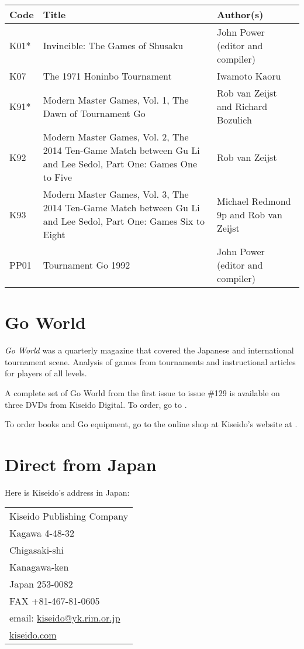 \begin{longtable}{l|p{55mm}|p{55mm}} 
    \hline
    \textbf{Code} & \textbf{Title} & \textbf{Author(s)} \\
    \hline \hline
    K01* & Invincible: The Games of Shusaku & John Power (editor and compiler) \\
    \hline
    K07 & The 1971 Honinbo Tournament & Iwamoto Kaoru \\
    \hline
    K91* & Modern Master Games, Vol. 1, The Dawn of Tournament Go & Rob van Zeijst and Richard Bozulich \\
    \hline
    K92 & Modern Master Games, Vol. 2, The 2014 Ten-Game Match between Gu Li and Lee Sedol, Part One: Games One to Five & Rob van Zeijst \\
    \hline
    K93 & Modern Master Games, Vol. 3, The 2014 Ten-Game Match between Gu Li and Lee Sedol, Part One: Games Six to Eight & Michael Redmond 9p and Rob van Zeijst \\
    \hline
    PP01 & Tournament Go 1992 & John Power (editor and compiler) \\
    \hline
\end{longtable}

\section{Go World}

\emph{Go World} was a quarterly magazine that covered the Japanese and international tournament scene. Analysis of games from tournaments and instructional articles for players of all levels.

A complete set of Go World from the first issue to issue \#129 is available on three DVDs from Kiseido Digital. To order, go to \href{https://www.kiseidodigital.com}{}.

To order books and Go equipment, go to the online shop at Kiseido's website at \href{https://www.kiseido.com}{}.

\section{Direct from Japan}

Here is Kiseido's address in Japan:

\bigskip
\bigskip

\begin{tabular}{l}
    \hline
    Kiseido Publishing Company \\
    Kagawa 4-48-32 \\
    Chigasaki-shi \\
    Kanagawa-ken \\
    Japan 253-0082 \\
    FAX +81-467-81-0605 \\
    email: \href{mailto:kiseido@yk.rim.or.jp}{kiseido@yk.rim.or.jp} \\
    \href{https://www.kiseido.com}{kiseido.com} \\
    \hline
\end{tabular}